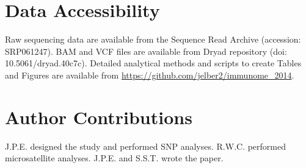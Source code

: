\documentclass[english]{article}\usepackage[]{graphicx}\usepackage[]{color}
\begin{document}
\singlespacing



\doublespacing
\section*{Data Accessibility}
\noindent
Raw sequencing data are available from the Sequence Read Archive (accession: SRP061247).
BAM and VCF files are available from Dryad repository (doi: 10.5061/dryad.40c7c).
Detailed analytical methods and scripts to create Tables and Figures are available from \url{https://github.com/jelber2/immunome_2014}.

\section*{Author Contributions}
\noindent
J.P.E. designed the study and performed SNP analyses. R.W.C. performed microsatellite analyses. J.P.E. and S.S.T. wrote the paper.
\end{document}

